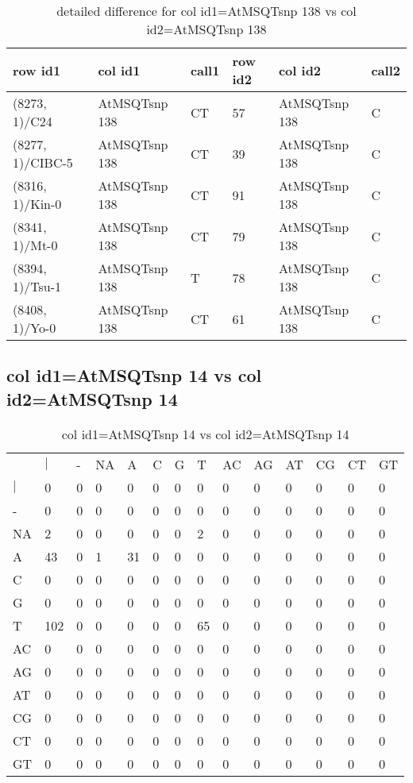 \begin{center}
\begin{longtable}{|l|l|l|l|l|l|}
\caption{detailed difference for col id1=AtMSQTsnp 138 vs col id2=AtMSQTsnp 138} \label{table_dm525}\\
\hline
row id1&col id1&call1&row id2&col id2&call2\\
\hline
(8273, 1)/C24&AtMSQTsnp 138&CT&57&AtMSQTsnp 138&C\\
(8277, 1)/CIBC-5&AtMSQTsnp 138&CT&39&AtMSQTsnp 138&C\\
(8316, 1)/Kin-0&AtMSQTsnp 138&CT&91&AtMSQTsnp 138&C\\
(8341, 1)/Mt-0&AtMSQTsnp 138&CT&79&AtMSQTsnp 138&C\\
(8394, 1)/Tsu-1&AtMSQTsnp 138&T&78&AtMSQTsnp 138&C\\
(8408, 1)/Yo-0&AtMSQTsnp 138&CT&61&AtMSQTsnp 138&C\\
\hline
\end{longtable}
\end{center}

\subsection{col id1=AtMSQTsnp 14 vs col id2=AtMSQTsnp 14}
\begin{center}
\begin{longtable}{|l|l|l|l|l|l|l|l|l|l|l|l|l|l|}
\caption{col id1=AtMSQTsnp 14 vs col id2=AtMSQTsnp 14} \label{table_dm526}\\
\hline
\\
\hline
&$|$&-&NA&A&C&G&T&AC&AG&AT&CG&CT&GT\\
$|$&0&0&0&0&0&0&0&0&0&0&0&0&0\\
-&0&0&0&0&0&0&0&0&0&0&0&0&0\\
NA&2&0&0&0&0&0&2&0&0&0&0&0&0\\
A&43&0&1&31&0&0&0&0&0&0&0&0&0\\
C&0&0&0&0&0&0&0&0&0&0&0&0&0\\
G&0&0&0&0&0&0&0&0&0&0&0&0&0\\
T&102&0&0&0&0&0&65&0&0&0&0&0&0\\
AC&0&0&0&0&0&0&0&0&0&0&0&0&0\\
AG&0&0&0&0&0&0&0&0&0&0&0&0&0\\
AT&0&0&0&0&0&0&0&0&0&0&0&0&0\\
CG&0&0&0&0&0&0&0&0&0&0&0&0&0\\
CT&0&0&0&0&0&0&0&0&0&0&0&0&0\\
GT&0&0&0&0&0&0&0&0&0&0&0&0&0\\
\hline
\end{longtable}
\end{center}

